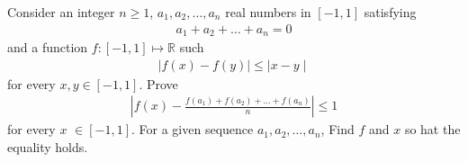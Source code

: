 Consider an integer $n \geq 1$, $a_1,a_2, \ldots , a_n$ real numbers in $[-1,1]$ satisfying
\begin{align*}a_1+a_2+\ldots +a_n=0 \end{align*}and a function $f: [-1,1] \mapsto \mathbb{R}$ such
\begin{align*} \mid f(x)-f(y) \mid \le \mid x-y \mid \end{align*}for every $x,y \in [-1,1]$. Prove
\begin{align*} \left| f(x) - \frac{f(a_1) +f(a_2) + \ldots + f(a_n)}{n}  \right| \le 1 \end{align*}for every $x$ $\in [-1,1]$. For a given sequence $a_1,a_2, \ldots ,a_n$, Find $f$ and $x$ so hat the equality holds.
